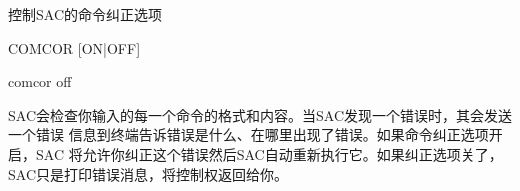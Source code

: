 \label{cmd:comcor}

控制SAC的命令纠正选项

\begin{SACSTX}
COMCOR [ON|OFF]
\end{SACSTX}

\begin{SACDFT}
comcor off
\end{SACDFT}

SAC会检查你输入的每一个命令的格式和内容。当SAC发现一个错误时，其会发送一个错误
信息到终端告诉错误是什么、在哪里出现了错误。如果命令纠正选项开启，SAC	
将允许你纠正这个错误然后SAC自动重新执行它。如果纠正选项关了，
SAC只是打印错误消息，将控制权返回给你。
